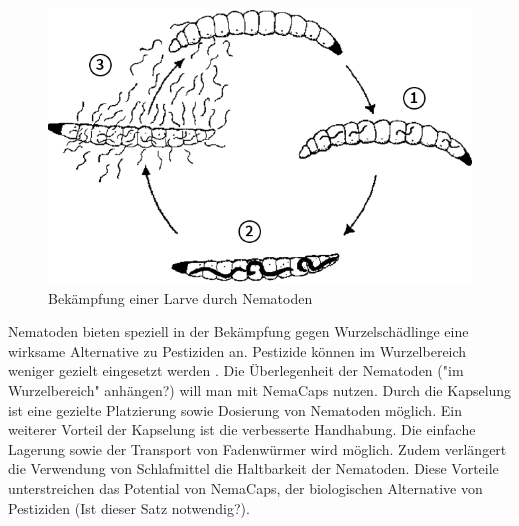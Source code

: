 \begin{figure}
	\includegraphics[scale=0.4]{Illustrationen/3-Einleitung/zyklus_nematoden.png}
\caption{Bekämpfung einer Larve durch Nematoden}
\label{fig:zyklus_Nematoden}
\end{figure}

	
Nematoden bieten speziell in der Bekämpfung gegen Wurzelschädlinge eine wirksame Alternative zu Pestiziden an. Pestizide können im Wurzelbereich weniger gezielt eingesetzt werden \cite{nfp}. Die Überlegenheit der Nematoden ("im Wurzelbereich" anhängen?) will man mit NemaCaps nutzen. Durch die Kapselung ist eine gezielte Platzierung sowie Dosierung von Nematoden möglich. Ein weiterer Vorteil der Kapselung ist die verbesserte Handhabung. Die einfache Lagerung sowie der Transport von Fadenwürmer wird möglich.  Zudem verlängert die Verwendung von Schlafmittel die Haltbarkeit der Nematoden. Diese Vorteile unterstreichen das Potential von NemaCaps, der biologischen Alternative von Pestiziden (Ist dieser Satz notwendig?).
